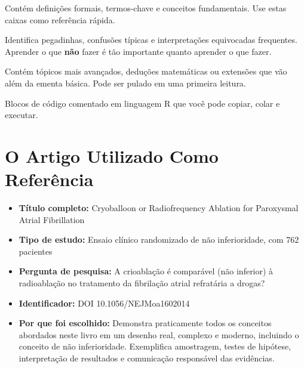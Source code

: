 \begin{definition}
Contém definições formais, termos-chave e conceitos fundamentais. Use estas caixas como referência rápida.
\end{definition}

\begin{error}
Identifica pegadinhas, confusões típicas e interpretações equivocadas frequentes. Aprender o que \textbf{não} fazer é tão importante quanto aprender o que fazer.
\end{error}

\begin{deepdive}
Contém tópicos mais avançados, deduções matemáticas ou extensões que vão além da ementa básica. Pode ser pulado em uma primeira leitura.
\end{deepdive}

\begin{code}[Código em R]
Blocos de código comentado em linguagem R que você pode copiar, colar e executar.
\end{code}

\section*{O Artigo Utilizado Como Referência}

\begin{definition}
\begin{itemize}
\item \textbf{Título completo:} Cryoballoon or Radiofrequency Ablation for Paroxysmal Atrial Fibrillation

\item \textbf{Tipo de estudo:} Ensaio clínico randomizado de não inferioridade, com 762 pacientes

\item \textbf{Pergunta de pesquisa:} A crioablação é comparável (não inferior) à radioablação no tratamento da fibrilação atrial refratária a drogas?

\item \textbf{Identificador:} DOI 10.1056/NEJMoa1602014

\item \textbf{Por que foi escolhido:} Demonstra praticamente todos os conceitos abordados neste livro em um desenho real, complexo e moderno, incluindo o conceito de não inferioridade. Exemplifica amostragem, testes de hipótese, interpretação de resultados e comunicação responsável das evidências.


\end{itemize}
\end{definition}

